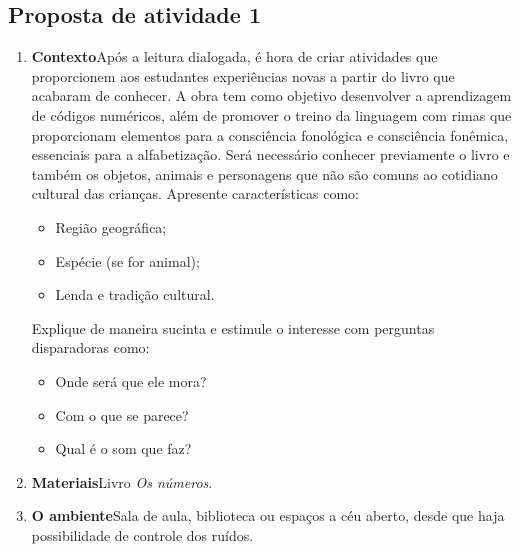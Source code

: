 \documentclass[11pt]{extarticle}
\begin{document}
\subsection{Proposta de atividade 1}



\begin{enumerate}
\item \textbf{Contexto}\quad Após a leitura dialogada, é hora de criar 
atividades que proporcionem aos estudantes experiências novas a partir do livro
que acabaram de conhecer.
A obra tem como objetivo desenvolver a aprendizagem de códigos numéricos, além de promover o treino da linguagem com rimas que proporcionam elementos para a consciência fonológica e consciência fonêmica, essenciais para a alfabetização. Será necessário conhecer previamente  o livro e também os objetos, animais e personagens que não são comuns ao cotidiano cultural das crianças.  Apresente características como:

\begin{itemize}
\item Região geográfica;

\item Espécie (se for animal);

\item Lenda e tradição cultural.
\end{itemize} 

Explique de maneira sucinta e estimule o interesse com perguntas disparadoras como:

\begin{itemize}
\item Onde será que ele mora?

\item Com o que se parece?

\item Qual é o som que faz? 
\end{itemize} 



\item \textbf{Materiais}\quad Livro \textit{Os números}.

\item \textbf{O ambiente}\quad Sala de aula, biblioteca ou espaços a céu aberto, desde que haja possibilidade de controle dos ruídos. 


\end{enumerate}
\end{document}
